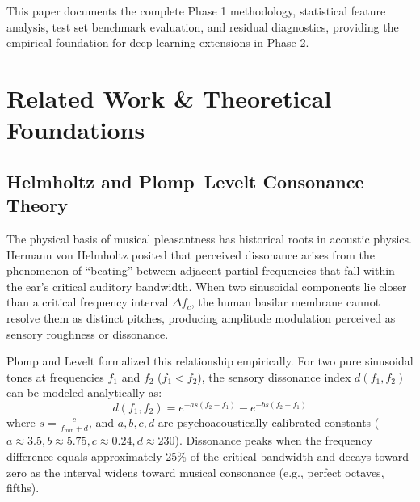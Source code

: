 \documentclass[conference]{IEEEtran}
\begin{document}
This paper documents the complete Phase 1 methodology, statistical feature analysis, test set benchmark evaluation, and residual diagnostics, providing the empirical foundation for deep learning extensions in Phase 2.

\section{Related Work \& Theoretical Foundations}

\subsection{Helmholtz and Plomp--Levelt Consonance Theory}
The physical basis of musical pleasantness has historical roots in acoustic physics. Hermann von Helmholtz \cite{helmholtz1885sensations} posited that perceived dissonance arises from the phenomenon of ``beating'' between adjacent partial frequencies that fall within the ear's critical auditory bandwidth. When two sinusoidal components lie closer than a critical frequency interval $\Delta f_c$, the human basilar membrane cannot resolve them as distinct pitches, producing amplitude modulation perceived as sensory roughness or dissonance.

Plomp and Levelt \cite{plomp1965tonal} formalized this relationship empirically. For two pure sinusoidal tones at frequencies $f_1$ and $f_2$ ($f_1 < f_2$), the sensory dissonance index $d(f_1, f_2)$ can be modeled analytically as:
\begin{equation}
d(f_1, f_2) = e^{-a s (f_2 - f_1)} - e^{-b s (f_2 - f_1)}
\end{equation}
where $s = \frac{c}{f_{\min} + d}$, and $a, b, c, d$ are psychoacoustically calibrated constants ($a \approx 3.5, b \approx 5.75, c \approx 0.24, d \approx 230$). Dissonance peaks when the frequency difference equals approximately 25\% of the critical bandwidth and decays toward zero as the interval widens toward musical consonance (e.g., perfect octaves, fifths).
\end{document}
